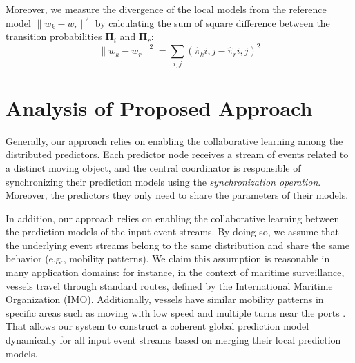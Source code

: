 \par Moreover, we measure the divergence of the local models from the reference model  $\|w_k - w_r\|^2$ by calculating the sum of square difference between the transition probabilities  $\boldsymbol{\Pi}_i$ and  $\boldsymbol{\Pi}_r$:
\begin{equation*}
\label{eq:dis_pi_varinace}
\|w_k - w_r\|^2=\sum_{i,j} (\hat{\pi}_k{i,j} -\hat{\pi}_r{i,j})^2
\end{equation*}


\section{Analysis of Proposed Approach}

\par Generally, our approach relies on enabling the collaborative learning among the distributed predictors. Each predictor node receives a stream of events related to a distinct moving object, and the central coordinator is responsible of synchronizing their prediction models using the \textit{synchronization operation}. Moreover, the predictors they only need to share the parameters of their models. 

\par In addition, our approach relies on enabling the collaborative learning between the prediction models of  the input event streams. By doing so, we assume that the underlying event streams belong to the same  distribution and share the same behavior (e.g., mobility patterns). We claim this assumption is reasonable in many application domains: for instance, in the context of maritime surveillance, vessels travel through standard routes, defined by the International Maritime Organization (IMO). Additionally, vessels have similar mobility patterns in specific areas such as moving with low speed and multiple turns near the ports \cite{pallotta2013vessel,liu2014knowledge}. That allows our system to construct a coherent global prediction model dynamically for all input event streams based on merging their local prediction models.


